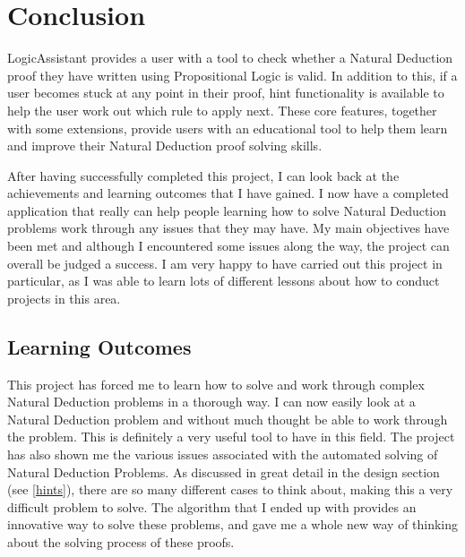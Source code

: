 \pagebreak
\section{Conclusion}

LogicAssistant provides a user with a tool to check whether a Natural Deduction proof they have written using Propositional Logic is valid. In addition to this, if a user becomes stuck at any point in their proof, hint functionality is available to help the user work out which rule to apply next. These core features, together with some extensions, provide users with an educational tool to help them learn and improve their Natural Deduction proof solving skills. 

After having successfully completed this project, I can look back at the achievements and learning outcomes that I have gained. I now have a completed application that really can help people learning how to solve Natural Deduction problems work through any issues that they may have. My main objectives have been met and although I encountered some issues along the way, the project can overall be judged a success. I am very happy to have carried out this project in particular, as I was able to learn lots of different lessons about how to conduct projects in this area.

\subsection{Learning Outcomes}
This project has forced me to learn how to solve and work through complex Natural Deduction problems in a thorough way. I can now easily look at a Natural Deduction problem and without much thought be able to work through the problem. This is definitely a very useful tool to have in this field. The project has also shown me the various issues associated with the automated solving of Natural Deduction Problems. As discussed in great detail in the design section (see \ref{hints}), there are so many different cases to think about, making this a very difficult problem to solve. The algorithm that I ended up with provides an innovative way to solve these problems, and gave me a whole new way of thinking about the solving process of these proofs. 


